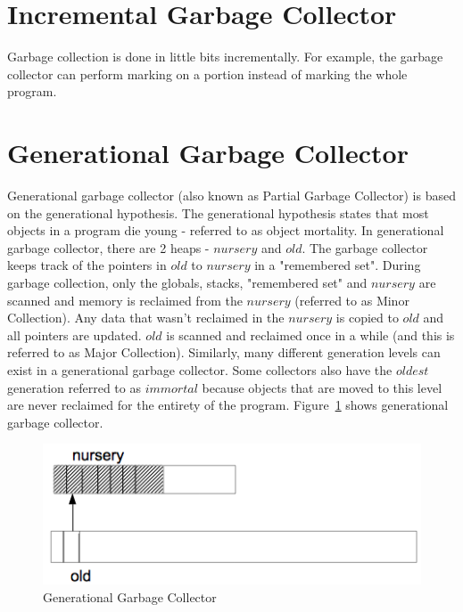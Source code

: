 \documentclass[twoside]{article}
\begin{document}
\section{Incremental Garbage Collector}
Garbage collection is done in little bits incrementally. For example, the garbage collector can perform marking on a portion instead of marking the whole program.


\section{Generational Garbage Collector}
Generational garbage collector (also known as Partial Garbage Collector) is based on the generational hypothesis. The generational hypothesis states that most objects in a program die young - referred to as object mortality. In generational garbage collector, there are 2 heaps - $nursery$ and $old$. The garbage collector keeps track of the pointers in $old$ to $nursery$ in a "remembered set". During garbage collection, only the globals, stacks, "remembered set" and $nursery$ are scanned and memory is reclaimed from the $nursery$ (referred to as Minor Collection). Any data that wasn't reclaimed in the $nursery$ is copied to $old$ and all pointers are updated. $old$ is scanned and reclaimed once in a while (and this is referred to as Major Collection). Similarly, many different generation levels can exist in a generational garbage collector. Some collectors also have the $oldest$ generation referred to as $immortal$ because objects that are moved to this level are never reclaimed for the entirety of the program. Figure~\ref{fig:generational} shows generational garbage collector.
\begin{figure}[h]
\centering
\includegraphics[scale=0.5]{generational}
\caption{Generational Garbage Collector \label{fig:generational}}
\end{figure}
\end{document}
